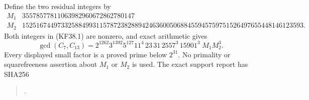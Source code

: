 \documentclass[11pt,a4paper]{article}
\theoremstyle{definition}
\begin{document}
Define the two residual integers by
{\footnotesize
\[
\begin{array}{c|r}
 M_1&35578577811063982960672862780147\\
 M_2&15251674497332588499311578723828894246360050688455945759751526497655448146123593.
\end{array}                                                \tag{KF38.2}
\]
}
Both integers in (KF38.1) are nonzero, and exact arithmetic gives
\[
 \gcd(C_7,C_{13})=
 2^{1262}3^{1392}5^{127}11^4\,23\,31\,2557^3\,15901^3
                                  \;M_1M_2^3.             \tag{KF38.3}
\]
Every displayed small factor is a proved prime below $2^{31}$.
No primality or squarefreeness assertion about $M_1$ or $M_2$
is used.  The exact support report has SHA256
\begin{quote}\small
{}.
\end{quote}
\end{document}
